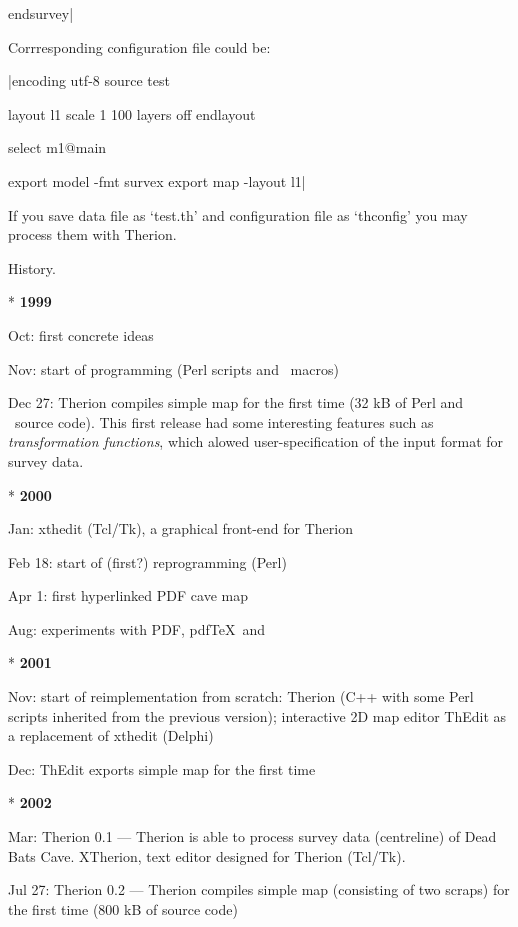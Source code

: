 endsurvey|

Corrresponding configuration file could be:

|encoding  utf-8
source test

layout l1
  scale 1 100
  layers off
endlayout

select m1@main

export model -fmt survex
export map -layout l1|

If you save data file as `test.th' and configuration file as `thconfig' you may 
process them with Therion.



%

\subchapter History.

\list
{}
* {\bf 1999}

  Oct: first concrete ideas

  Nov: start of programming (Perl scripts and \MP\ macros)

  Dec 27: Therion compiles simple map for the first time (32 kB of Perl and 
       \MP\ source code). This first release had some interesting features
       such as {\it transformation functions}, which alowed user-specification
       of the input format for survey data.
				
* {\bf 2000}\nobreak\par\nobreak
  Jan: xthedit (Tcl/Tk), a graphical front-end for Therion

  Feb 18: start of (first?) reprogramming (Perl)

  Apr 1: first hyperlinked PDF cave map 

  Aug: experiments with PDF, pdf\TeX\ and \MP

* {\bf 2001}

  Nov: start of reimplementation from scratch: 
       Therion (C++ with some Perl scripts inherited from the previous version); 
       interactive 2D map editor ThEdit as a replacement of xthedit (Delphi) 

  Dec: ThEdit exports simple map for the first time

* {\bf 2002}

  Mar: Therion 0.1 ---
       Therion is able to process survey data (centreline) of Dead Bats Cave.
       XTherion, text editor designed for Therion (Tcl/Tk).

  Jul 27: Therion 0.2 ---
       Therion compiles simple map (consisting of two scraps)
       for the first time (800 kB of source code)

